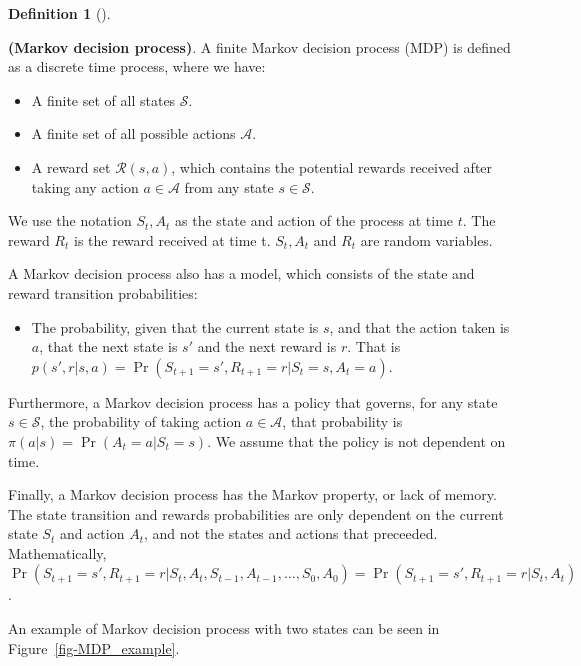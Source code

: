 \documentclass[
  letterpaper,
]{report}
\providecommand{\tightlist}{%
  \setlength{\itemsep}{0pt}\setlength{\parskip}{0pt}}\usepackage{longtable,booktabs,array}
\theoremstyle{definition}
\newtheorem{definition}{Definition}[chapter]
\theoremstyle{plain}
\theoremstyle{definition}
\theoremstyle{remark}
\begin{document}
\begin{definition}[]\protect\hypertarget{def-Markov_decision_process}{}\label{def-Markov_decision_process}

\textbf{(Markov decision process)}. A finite Markov decision process
(MDP) is defined as a discrete time process, where we have:

\begin{itemize}
\tightlist
\item
  A finite set of all states \(\mathcal{S}\).
\item
  A finite set of all possible actions \(\mathcal{A}\).
\item
  A reward set \(\mathcal{R}(s,a)\), which contains the potential
  rewards received after taking any action \(a\in\mathcal{A}\) from any
  state \(s\in\mathcal{S}\).
\end{itemize}

We use the notation \(S_t, A_t\) as the state and action of the process
at time \(t\). The reward \(R_t\) is the reward received at time t.
\(S_t,A_t\) and \(R_t\) are random variables.

A Markov decision process also has a model, which consists of the state
and reward transition probabilities:

\begin{itemize}
\tightlist
\item
  The probability, given that the current state is \(s\), and that the
  action taken is \(a\), that the next state is \(s'\) and the next
  reward is \(r\). That is
  \(p(s',r|s,a) = \Pr(S_{t+1} = s', R_{t+1} = r | S_t = s, A_t = a)\).
\end{itemize}

Furthermore, a Markov decision process has a policy that governs, for
any state \(s\in\mathcal{S}\), the probability of taking action
\(a\in\mathcal{A}\), that probability is
\(\pi(a|s) = \Pr(A_t = a|S_t = s)\). We assume that the policy is not
dependent on time.

Finally, a Markov decision process has the Markov property, or lack of
memory. The state transition and rewards probabilities are only
dependent on the current state \(S_t\) and action \(A_t\), and not the
states and actions that preceeded. Mathematically,
\(\Pr(S_{t+1} = s', R_{t+1} = r|S_t, A_t, S_{t-1}, A_{t-1}, \dots , S_0, A_0) = \Pr(S_{t+1} = s', R_{t+1} = r | S_t, A_t)\).

\end{definition}

An example of Markov decision process with two states can be seen in
Figure~\ref{fig-MDP_example}.
\end{document}
